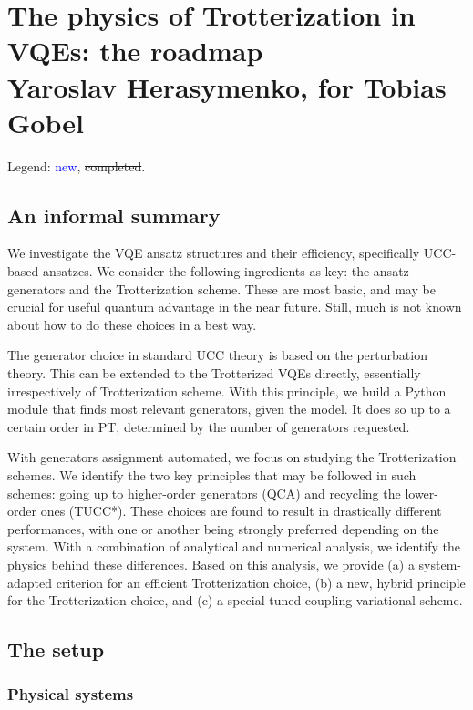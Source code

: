 \documentclass[10pt, a4paper]{article}
\def\blue{\textcolor{blue}}
\begin{document}
\section*{The physics of Trotterization in VQEs: the roadmap\\
\small{Yaroslav Herasymenko, for Tobias Gobel}}

Legend: \blue{new}, \st{completed}.

\subsection*{An informal summary}

We investigate the VQE ansatz structures and their efficiency, specifically UCC-based ansatzes. We consider the following ingredients as key: the ansatz generators and the Trotterization scheme. These are most basic, and may be crucial for useful quantum advantage in the near future. Still, much is not known about how to do these choices in a best way.

The generator choice in standard UCC theory is based on the perturbation theory. This can be extended to the Trotterized VQEs directly, essentially irrespectively of Trotterization scheme. With this principle, we build a Python module that finds most relevant generators, given the model. It does so up to a certain order in PT, determined by the number of generators requested.

With generators assignment automated, we focus on studying the Trotterization schemes. We identify the two key principles that may be followed in such schemes: going up to higher-order generators (QCA) and recycling the lower-order ones (TUCC*). These choices are found to result in drastically different performances, with one or another being strongly preferred depending on the system. With a combination of analytical and numerical analysis, we identify the physics behind these differences. Based on this analysis, we provide (a) a system-adapted criterion for an efficient Trotterization choice, (b) a new, hybrid principle for the Trotterization choice, and (c) a special tuned-coupling variational scheme.

\subsection*{The setup}


\subsubsection*{Physical systems}
\end{document}
